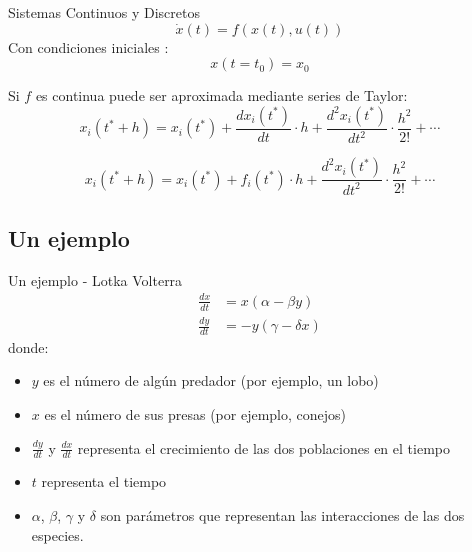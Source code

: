 \documentclass[10pt,handout]{beamer}
\begin{document}
\begin{frame}{Sistemas Continuos y Discretos}
	\begin{equation*} 
	\dot{x}(t) = f (x(t), u(t))
	\end{equation*}
	Con condiciones iniciales :
	\begin{equation*}
	x(t = t_0 ) = x_0
	\end{equation*}

	Si $f$ es continua puede ser aproximada mediante series de Taylor:
	\begin{equation*}
		x_i(t^* + h) = x_i(t^*) + \frac{dx_i (t^*)}{dt} \cdot h + \frac{d^{2}x_i (t^*)}{dt^2} \cdot \frac{h^2}{2!} + \cdots
	\end{equation*}

	\begin{equation*}
		x_i(t^* + h) = x_i(t^*) + f_i(t^*) \cdot h + \frac{d^{2}x_i (t^*)}{dt^2} \cdot \frac{h^2}{2!} + \cdots
	\end{equation*}


\end{frame}

	\subsection{Un ejemplo}

\begin{frame}{Un ejemplo - Lotka Volterra}
	\begin{align*}
		\frac{dx}{dt} &= x(\alpha - \beta y) \\
		\frac{dy}{dt} &= - y(\gamma - \delta  x)
	\end{align*}
	donde:
	\begin{itemize}
		\item $y$ es el número de algún predador (por ejemplo, un lobo)
		\item $x$ es el número de sus presas (por ejemplo, conejos)
		\item $\frac{dy}{dt}$ y $\frac{dx}{dt}$ representa el crecimiento de las dos poblaciones en el tiempo
		\item $t$ representa el tiempo 
		\item $\alpha$, $\beta$, $\gamma$ y $\delta$ son parámetros que representan las interacciones de las dos especies.
	\end{itemize}
\end{frame}
\end{document}
